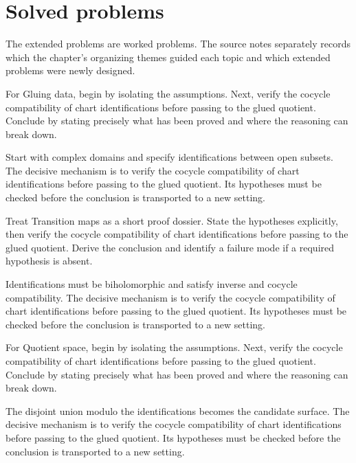 \section{Solved problems}
The extended problems are worked problems. The source notes separately records which the chapter's organizing themes guided each topic and which extended problems were newly designed.

\begin{problem}\label{prob:iv25-problem-01}
For Gluing data, begin by isolating the assumptions. Next, verify the cocycle compatibility of chart identifications before passing to the glued quotient. Conclude by stating precisely what has been proved and where the reasoning can break down.
\end{problem}
\begin{solution}
Start with complex domains and specify identifications between open subsets. The decisive mechanism is to verify the cocycle compatibility of chart identifications before passing to the glued quotient. Its hypotheses must be checked before the conclusion is transported to a new setting.
\end{solution}

\begin{problem}\label{prob:iv25-problem-02}
Treat Transition maps as a short proof dossier. State the hypotheses explicitly, then verify the cocycle compatibility of chart identifications before passing to the glued quotient. Derive the conclusion and identify a failure mode if a required hypothesis is absent.
\end{problem}
\begin{solution}
Identifications must be biholomorphic and satisfy inverse and cocycle compatibility. The decisive mechanism is to verify the cocycle compatibility of chart identifications before passing to the glued quotient. Its hypotheses must be checked before the conclusion is transported to a new setting.
\end{solution}

\begin{problem}\label{prob:iv25-problem-03}
For Quotient space, begin by isolating the assumptions. Next, verify the cocycle compatibility of chart identifications before passing to the glued quotient. Conclude by stating precisely what has been proved and where the reasoning can break down.
\end{problem}
\begin{solution}
The disjoint union modulo the identifications becomes the candidate surface. The decisive mechanism is to verify the cocycle compatibility of chart identifications before passing to the glued quotient. Its hypotheses must be checked before the conclusion is transported to a new setting.
\end{solution}

